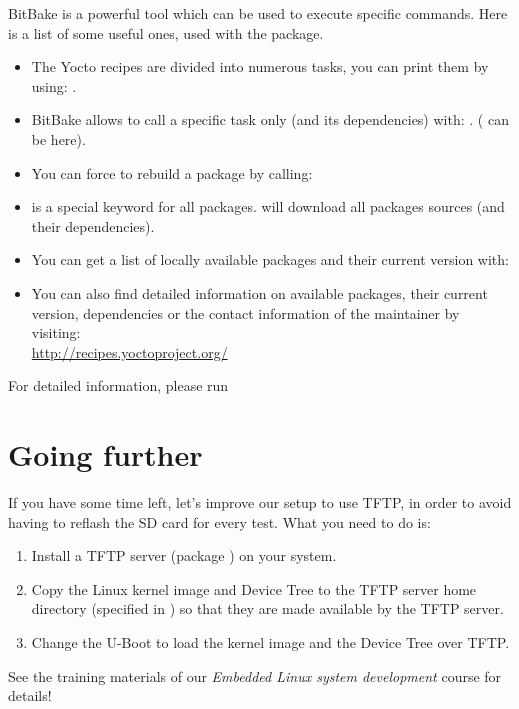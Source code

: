 BitBake is a powerful tool which can be used to execute specific commands. Here
is a list of some useful ones, used with the  package.

\begin{itemize}
  \item The Yocto recipes are divided into numerous tasks, you can print them
        by using: .
  \item BitBake allows to call a specific task only (and its dependencies)
        with: . ( can be
         here).
  \item You can force to rebuild a package by calling: 
  \item {} is a special keyword for all packages.  will download all packages sources (and their
        dependencies).
  \item You can get a list of locally available packages and their current
        version with: \\
  \item You can also find detailed information on available packages, their
        current version, dependencies or the contact information of the
        maintainer by visiting: \\
        \url{http://recipes.yoctoproject.org/}
\end{itemize}

For detailed information, please run 

\section{Going further}

If you have some time left, let's improve our setup to use TFTP, in
order to avoid having to reflash the SD card for every test. What you
need to do is:

\begin{enumerate}

\item Install a TFTP server (package ) on your system.

\item Copy the Linux kernel image and Device Tree to
  the TFTP server home directory (specified in
  ) so that they are made available by the TFTP
  server.

\item Change the U-Boot  to load the kernel image and
  the Device Tree over TFTP.

\end{enumerate}

See the training materials of our {\em Embedded Linux system
  development} course for details!
